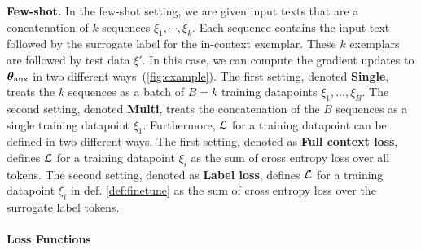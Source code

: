 \textbf{Few-shot.}
In the few-shot setting, we are given input texts that are a concatenation of $k$ sequences $\xi_1, \cdots, \xi_k$.
Each sequence contains the input text followed by the surrogate label for the in-context exemplar.
These $k$ exemplars are followed by test data $\xi'$. 
In this case, we can compute the gradient updates to ${\bm{\theta}}_{\text{aux}}$ in two different ways~(\cref{fig:example}). 
The first setting, denoted \textbf{Single}, treats the $k$ sequences as a batch of $B=k$ training datapoints $\xi_1,...,\xi_B$.
The second setting, denoted \textbf{Multi}, treats the concatenation of the $B$ sequences as a single training datapoint $\xi_1$.
Furthermore, $\mathcal{L}$ for a training datapoint can be defined in two different ways. The first setting, denoted as \textbf{Full context loss}, defines $\mathcal{L}$ for a training datapoint $\xi_i$ as the sum of cross entropy loss over all tokens. The second setting, denoted as \textbf{Label loss}, defines $\mathcal{L}$ for a training datapoint $\xi_i$ in def. \ref{def:finetune} as the sum of cross entropy loss over the surrogate label tokens.
\iffalse



\paragraph{Loss Functions}



